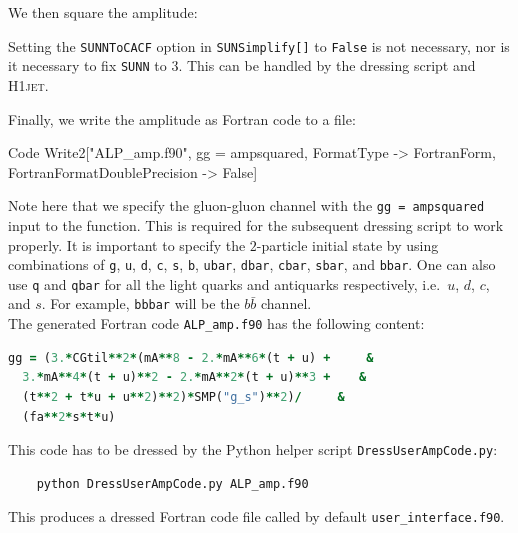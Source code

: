 \documentclass[12pt]{article}
\begin{document}
We then square the amplitude: 
Setting the \texttt{SUNNToCACF} option in \texttt{SUNSimplify[]} to \texttt{False} is not necessary, nor is it necessary to fix \texttt{SUNN} to $3$. This can be handled by the dressing script and \textsc{H1jet}. 

Finally, we  write the amplitude as Fortran code to a file: 
\begin{mmaCell}{Code}
Write2["ALP_amp.f90", gg = ampsquared, FormatType -> FortranForm, FortranFormatDoublePrecision -> False] 
\end{mmaCell}
Note here that we specify the gluon-gluon channel with the \texttt{gg = ampsquared} input to the function. This is required for the subsequent dressing script to work properly. It is important to specify the $2$-particle initial state by using combinations of \texttt{g}, \texttt{u}, \texttt{d}, \texttt{c}, \texttt{s}, \texttt{b}, \texttt{ubar}, \texttt{dbar}, \texttt{cbar}, \texttt{sbar}, and \texttt{bbar}. One can also use \texttt{q} and \texttt{qbar} for all the light quarks and antiquarks respectively, i.e.\ $u$, $d$, $c$, and $s$. For example, \texttt{bbbar} will be the $b\bar{b}$ channel. \\ 

The generated Fortran code \texttt{ALP\_amp.f90} has the following content:
\begin{lstlisting}[language=Fortran,keywordstyle=\color{Red},stringstyle=\color{Green},identifierstyle=\color{Blue},showstringspaces=false]
  gg = (3.*CGtil**2*(mA**8 - 2.*mA**6*(t + u) +     &
  3.*mA**4*(t + u)**2 - 2.*mA**2*(t + u)**3 +    &
  (t**2 + t*u + u**2)**2)*SMP("g_s")**2)/     &
  (fa**2*s*t*u)
\end{lstlisting}
This code has to be dressed by the Python helper script \texttt{DressUserAmpCode.py}: 
\begin{lstlisting}
	python DressUserAmpCode.py ALP_amp.f90 
\end{lstlisting}
This produces a dressed Fortran code file called by default
\texttt{user\_interface.f90}.
\end{document}
